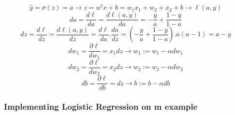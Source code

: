   
  \begin{equation}\label{eq:logistic_regression_derivatives_single_example}
    \boxed{\widehat{y} = \sigma(z) = a} \longrightarrow  \boxed{ z = w^tx + b = w_1x_1+ w_2+x_2+ b} \longrightarrow \boxed{\ell(a,y)}
  \end{equation}
  \begin{equation}\label{eq:logistic_regression_derivatives_da}
      \boxed{da =  \frac{d\ell}{da} = \frac{d\ell(a,y)}{da} = - \frac{y}{a} + \frac{1-y}{1-a}}
  \end{equation}
    \begin{equation}\label{eq:logistic_regression_derivatives_dz}
    \boxed{dz = \frac{d\ell}{dz} =  \frac{d\ell(a,y)}{dz} =  \frac{d\ell}{da} .  \frac{da}{dz}} = \boxed{(- \frac{y}{a} + \frac{1-y}{1-a}) . a(a-1) } = \boxed{ a - y    }
  \end{equation}
 \begin{equation}\label{eq:logistic_regression_derivatives_dw1}
      \boxed{dw_1 = \frac{\partial\ell}{dw_1} = x_1 dz} \longrightarrow \boxed{ w_1 := w_1 - \alpha dw_1}
  \end{equation}
    \begin{equation}\label{eq:logistic_regression_derivatives_dw2}
    \boxed{dw_2 = \frac{\partial\ell}{dw_2} = x_2 dz} \longrightarrow \boxed{ w_2 := w_2  - \alpha dw_2}
  \end{equation}
    \begin{equation}\label{eq:logistic_regression_derivatives_db}
    \boxed{db = \frac{\partial\ell}{db} =  dz} \longrightarrow \boxed{ b := b - \alpha db}
\end{equation}


 \subsubsection{Implementing Logistic Regression on m example}

